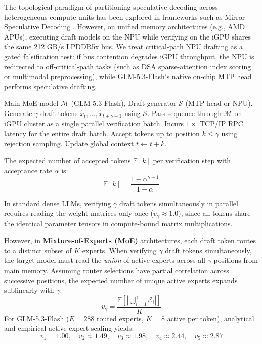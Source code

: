 \documentclass[11pt,a4paper]{article}
\begin{document}
The topological paradigm of partitioning speculative decoding across heterogeneous compute units has been explored in frameworks such as Mirror Speculative Decoding \cite{mirror_spec}. However, on unified memory architectures (e.g., AMD APUs), executing draft models on the NPU while verifying on the iGPU shares the same 212 GB/s LPDDR5x bus. We treat critical-path NPU drafting as a gated falsification test: if bus contention degrades iGPU throughput, the NPU is redirected to off-critical-path tasks (such as DSA sparse-attention index scoring or multimodal preprocessing), while GLM-5.3-Flash's native on-chip MTP head performs speculative drafting.

\begin{algorithm}[ht!]
\caption{HCC Speculative Network Amortization}\label{alg:spec_decode}
\begin{algorithmic}[1]
\Require Main MoE model $\mathcal{M}$ (GLM-5.3-Flash), Draft generator $\mathcal{S}$ (MTP head or NPU).
    \State Generate $\gamma$ draft tokens $\hat{x}_{t}, \dots, \hat{x}_{t+\gamma-1}$ using $\mathcal{S}$.
    \State Pass sequence through $\mathcal{M}$ on iGPU cluster as a single parallel verification batch.
    \State Incurs $1 \times$ TCP/IP RPC latency for the entire draft batch.
    \State Accept tokens up to position $k \le \gamma$ using rejection sampling.
    \State Update global context $t \gets t + k$.
\EndWhile
\end{algorithmic}
\end{algorithm}

The expected number of accepted tokens $\mathbb{E}[k]$ per verification step with acceptance rate $\alpha$ is:
\begin{equation}
    \mathbb{E}[k] = \frac{1 - \alpha^{\gamma+1}}{1 - \alpha}
\end{equation}

In standard dense LLMs, verifying $\gamma$ draft tokens simultaneously in parallel requires reading the weight matrices only once ($v_\gamma \approx 1.0$), since all tokens share the identical parameter tensors in compute-bound matrix multiplications. 

However, in \textbf{Mixture-of-Experts (MoE)} architectures, each draft token routes to a distinct subset of $K$ experts. When verifying $\gamma$ draft tokens simultaneously, the target model must read the \textit{union} of active experts across all $\gamma$ positions from main memory. Assuming router selections have partial correlation across successive positions, the expected number of unique active experts expands sublinearly with $\gamma$:
\begin{equation}
    v_\gamma = \frac{\mathbb{E}\left[\left|\bigcup_{i=1}^{\gamma}\mathcal{E}_i\right|\right]}{K}
\end{equation}
For GLM-5.3-Flash ($E=288$ routed experts, $K=8$ active per token), analytical and empirical active-expert scaling yields:
\begin{equation}
    v_1 = 1.00, \quad v_2 \approx 1.49, \quad v_3 \approx 1.98, \quad v_4 \approx 2.44, \quad v_5 \approx 2.87
\end{equation}
\end{document}
